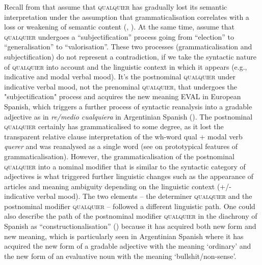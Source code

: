 Recall from  that \citet{cp2009} assume that \textsc{qualquier} has gradually lost its semantic interpretation under the assumption that grammaticalisation correlates with a loss or weakening of semantic content (\citealt{Lehmann2002}, \citet{cp2009}). At the same time,  \citet{cp2009} assume that \textsc{qualquier} undergoes a “subjectification” process going from “election” to “generalisation” to “valorisation”. These two processes (grammaticalisation and subjectification) do not represent a contradiction, if we take the syntactic nature of \textsc{qualquier} into account and the linguistic context in which it appears (e.g., indicative and modal verbal mood). It’s the postnominal \textsc{qualquier} under indicative verbal mood, not the prenominal \textsc{qualquier}, that undergoes the "subjectification" process and acquires the new meaning EVAL in European Spanish, which triggers a further process of syntactic reanalysis into a gradable adjective as in \textit {re/medio cualquiera} in Argentinian Spanish (). The postnominal \textsc{qualquier} certainly has grammaticalised to some degree, as it lost the transparent relative clause interpretation of the wh-word qual + modal verb \textit{querer} and was reanalysed as a single word (see \cite{Lehmann2002} on prototypical features of grammaticalisation). However, the grammaticalisation of the postnominal \textsc{qualquier} into a nominal modifier that is similar to the syntactic category of adjectives is what triggered further linguistic changes such as the appearance of articles and meaning ambiguity depending on the linguistic context (+/- indicative verbal mood). The two elements -- the determiner \textsc{qualquier} and the postnominal modifier \textsc{qualquier} -- followed a different linguistic path. One could also describe the path of the postnominal modifier \textsc{qualquier} in the diachrony of Spanish as “constructionalisation” (\citealt{traugott2013constructionalization}) because it has acquired both new form and new meaning, which is particularly seen in Argentinian Spanish where it has acquired the new form of a gradable adjective with the meaning ‘ordinary’ and the new form of an evaluative noun with the meaning ‘bullshit/non-sense’.


